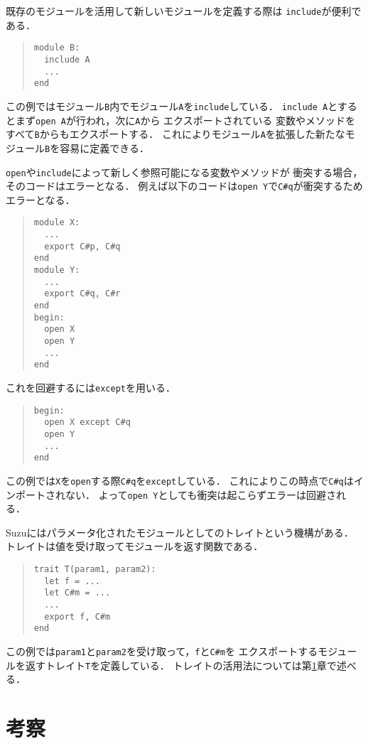 \documentclass[a4paper,11pt,dvipdfmx]{jreport}
\begin{document}
既存のモジュールを活用して新しいモジュールを定義する際は
\verb|include|が便利である．
\begin{quote}
\begin{verbatim}
module B:
  include A
  ...
end
\end{verbatim}
\end{quote}
この例ではモジュール\verb|B|内でモジュール\verb|A|を\verb|include|している．
\verb|include A|とするとまず\verb|open A|が行われ，次に\verb|A|から
エクスポートされている
変数やメソッドをすべて\verb|B|からもエクスポートする．
これによりモジュール\verb|A|を拡張した新たなモジュール\verb|B|を容易に定義できる．

\verb|open|や\verb|include|によって新しく参照可能になる変数やメソッドが
衝突する場合，そのコードはエラーとなる．
例えば以下のコードは\verb|open Y|で\verb|C#q|が衝突するためエラーとなる．
\begin{quote}
\begin{verbatim}
module X:
  ... 
  export C#p, C#q
end
module Y:
  ...
  export C#q, C#r
end
begin:
  open X
  open Y
  ...
end
\end{verbatim}
\end{quote}
これを回避するには\verb|except|を用いる．
\begin{quote}
\begin{verbatim}
begin:
  open X except C#q
  open Y
  ...
end
\end{verbatim}
\end{quote}
この例では\verb|X|を\verb|open|する際\verb|C#q|を\verb|except|している．
これによりこの時点で\verb|C#q|はインポートされない．
よって\verb|open Y|としても衝突は起こらずエラーは回避される．

Suzuにはパラメータ化されたモジュールとしてのトレイトという機構がある．
トレイトは値を受け取ってモジュールを返す関数である．
\begin{quote}
\begin{verbatim}
trait T(param1, param2):
  let f = ...
  let C#m = ...
  ...
  export f, C#m
end
\end{verbatim}
\end{quote}
この例では\verb|param1|と\verb|param2|を受け取って，\verb|f|と\verb|C#m|を
エクスポートするモジュールを返すトレイト\verb|T|を定義している．
トレイトの活用法については第\ref{chapter:discussion}章で述べる．


\chapter{考察}
\label{chapter:discussion}
\end{document}
